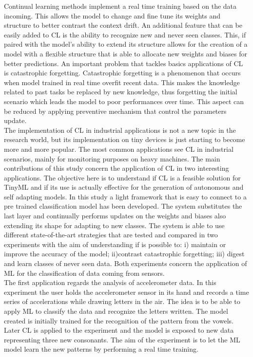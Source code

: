 \documentclass[12pt]{report}
\begin{document}
Continual learning methods implement a real time training based on the data incoming. This allows the model to change and fine tune its weights and structure to better contrast the context drift. 
An additional feature that can be easily added to CL is the ability to recognize new and never seen classes. This, if paired with the model's ability to extend its structure allows for the creation of a model with a flexible structure that is able to allocate new weights and biases for better predictions.  
An important problem that tackles basics applications of CL is catastrophic forgetting. Catastrophic forgetting is a phenomenon that occurs when model trained in real time overfit recent data. This makes the knowledge related to past tasks be replaced by new knowledge, thus forgetting the initial scenario which leads the model to poor performances over time. This aspect can be reduced by applying preventive mechanism that control the parameters update. \\
The implementation of CL in industrial applications is not a new topic in the research world, but its implementation on tiny devices is just starting to become more and more popular. The most common applications see CL in industrial scenarios, mainly for monitoring purposes on heavy machines.
The main contributions of this study concern the application of CL in two interesting applications. The objective here is to understand if CL is a feasible solution for TinyML and if its use is actually effective for the generation of autonomous and self adapting models. In this study a light framework that is easy to connect to a pre trained classification model has been developed. The system substitutes the last layer and continually performs updates on the weights and biases also extending its shape for adapting to new classes. The system is able to use different state-of-the-art strategies that are tested and compared in two experiments with the aim of understanding if is possible to: i) maintain or improve the accuracy of the model; ii)contrast catastrophic forgetting; iii) digest and learn classes of never seen data. Both experiments concern the application of ML for the classification of data coming from sensors. \\
The first application regards the analysis of accelerometer data. In this experiment the user holds the accelerometer sensor in its hand and records a time series of accelerations while drawing letters in the air. The idea is to be able to apply ML to classify the data and recognize the letters written. The model created is initially trained for the recognition of the pattern from the vowels. Later CL is applied to the experiment and the model is exposed to new data representing three new consonants. The aim of the experiment is to let the ML model learn the new patterns by performing a real time training.
\end{document}
